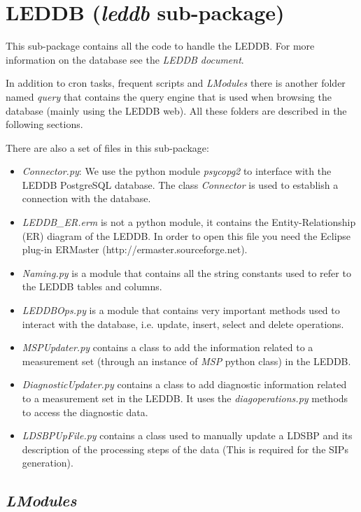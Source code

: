 \documentclass[a4paper,11pt]{article}
\begin{document}
\section{LEDDB (\textit{leddb} sub-package)}
\label{sec:leddb}

This sub-package contains all the code to handle the LEDDB. For more information on the database see the \textit{LEDDB document}.

In addition to cron tasks, frequent scripts and \textit{LModules} there is another folder named \textit{query} that contains the query engine that is used when browsing the database (mainly using the LEDDB web). All these folders are described in the following sections.

There are also a set of files in this sub-package:

\begin{itemize}
	\item \textit{Connector.py}: We use the python module \textit{psycopg2} to interface with the LEDDB PostgreSQL database. The class \textit{Connector} is used to establish a connection with the database.
	\item \textit{LEDDB\_ER.erm} is not a python module, it contains the Entity-Relationship (ER) diagram of the LEDDB. In order to open this file you need the Eclipse plug-in ERMaster (http://ermaster.sourceforge.net).
	\item \textit{Naming.py} is a module that contains all the string constants used to refer to the LEDDB tables and columns.
	\item \textit{LEDDBOps.py} is a module that contains very important methods used to interact with the database, i.e. update, insert, select and delete operations.
	\item \textit{MSPUpdater.py} contains a class to add the information related to a measurement set (through an instance of \textit{MSP} python class) in the LEDDB.
	\item \textit{DiagnosticUpdater.py} contains a class to add diagnostic information related to a measurement set in the LEDDB. It uses the \textit{diagoperations.py} methods to access the diagnostic data.
	\item \textit{LDSBPUpFile.py} contains a class used to manually update a LDSBP and its description of the processing steps of the data (This is required for the SIPs generation).
\end{itemize}

\subsection{\textit{LModules}}
\end{document}
